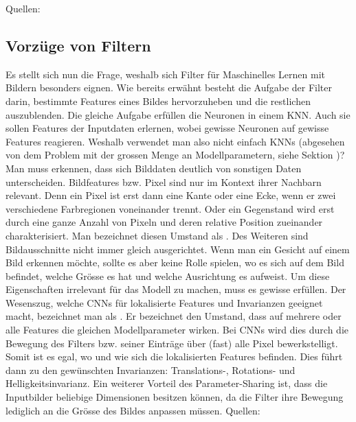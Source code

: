 Quellen: \cite{deeplearning.ai:cnn}

\subsection{Vorzüge von Filtern}
Es stellt sich nun die Frage, weshalb sich Filter für Maschinelles
Lernen mit Bildern besonders eignen.
Wie bereits erwähnt besteht die Aufgabe der Filter darin, bestimmte Features
eines Bildes hervorzuheben und die restlichen auszublenden. Die gleiche
Aufgabe erfüllen die Neuronen in einem KNN. Auch sie sollen Features der
Inputdaten erlernen, wobei gewisse Neuronen auf gewisse Features reagieren.
Weshalb verwendet man also nicht einfach KNNs (abgesehen
von dem Problem mit der grossen Menge an Modellparametern, siehe Sektion
)?
\para{}
Man muss erkennen, dass sich Bilddaten deutlich von sonstigen Daten unterscheiden.
Bildfeatures bzw. Pixel sind nur im Kontext ihrer Nachbarn relevant. Denn
ein Pixel ist erst dann eine Kante oder eine Ecke, wenn er zwei verschiedene
Farbregionen voneinander trennt. Oder ein Gegenstand wird erst durch eine ganze Anzahl
von Pixeln und deren relative Position zueinander charakterisiert.
Man bezeichnet diesen Umstand als .
\para{}
Des Weiteren sind Bildausschnitte nicht immer gleich
ausgerichtet. Wenn man ein Gesicht auf einem Bild erkennen möchte, sollte es aber
keine Rolle spielen, wo es sich auf dem Bild befindet, welche Grösse es
hat und welche Ausrichtung es aufweist. Um diese Eigenschaften irrelevant für das
Modell zu machen, muss es gewisse  erfüllen.
\para{}
Der Wesenszug, welche CNNs für lokalisierte Features und
Invarianzen geeignet macht, bezeichnet man als .
Er bezeichnet den Umstand, dass auf
mehrere oder alle Features die gleichen Modellparameter wirken. Bei CNNs wird
dies durch die Bewegung des Filters bzw. seiner Einträge über (fast) alle
Pixel bewerkstelligt. Somit ist
es egal, wo und wie sich die lokalisierten Features befinden. Dies führt dann zu
den gewünschten Invarianzen: Translations-, Rotations- und
Helligkeitsinvarianz.
\para{}
Ein weiterer Vorteil des Parameter-Sharing ist, dass die Inputbilder
beliebige Dimensionen besitzen können, da die Filter ihre Bewegung lediglich an
die Grösse des Bildes anpassen müssen.
\para{}
Quellen: \cite{deeplearning.ai:cnn}


